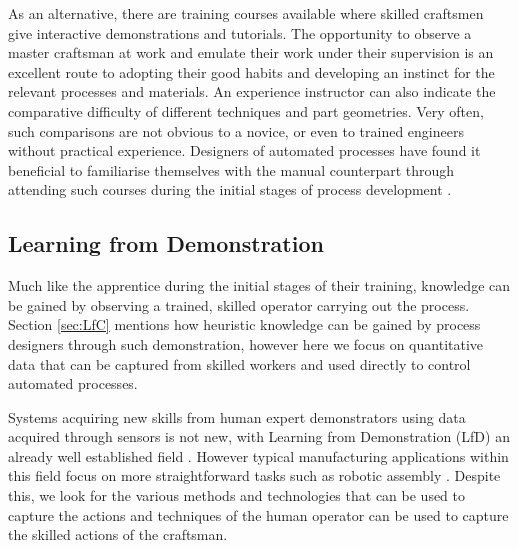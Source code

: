 As an alternative, there are training courses available where skilled craftsmen give interactive demonstrations and tutorials.  The opportunity to observe a master craftsman at work and emulate their work under their supervision is an excellent route to adopting their good habits and developing an instinct for the relevant processes and materials. An experience instructor can also indicate the comparative difficulty of different techniques and part geometries. Very often, such comparisons are not obvious to a novice, or even to trained engineers without practical experience. Designers of automated processes have found it beneficial to familiarise themselves with the manual counterpart through attending such courses during the initial stages of process development \citep{Ilangovan2016AnForming}.

%



\subsection{Learning from Demonstration} \label{sec:LfD} 
Much like the apprentice during the initial stages of their training, knowledge can be gained by observing a trained, skilled operator carrying out the process. Section \ref{sec:LfC} mentions how heuristic knowledge can be gained by process designers through such demonstration, however here we focus on quantitative data that can be captured from skilled workers and used directly to control automated processes.

Systems acquiring new skills from human expert demonstrators using data acquired through sensors is not new, with Learning from Demonstration (LfD)  an already well established field \citep{Ravichandar2020RecentDemonstration}. 
However typical manufacturing applications within this field focus on more straightforward tasks such as robotic assembly \citep{Zhu2018RobotSurvey}. Despite this, we look for the various methods and technologies that can be used to capture the actions and techniques of the human operator can be used to capture the skilled actions of the craftsman.


